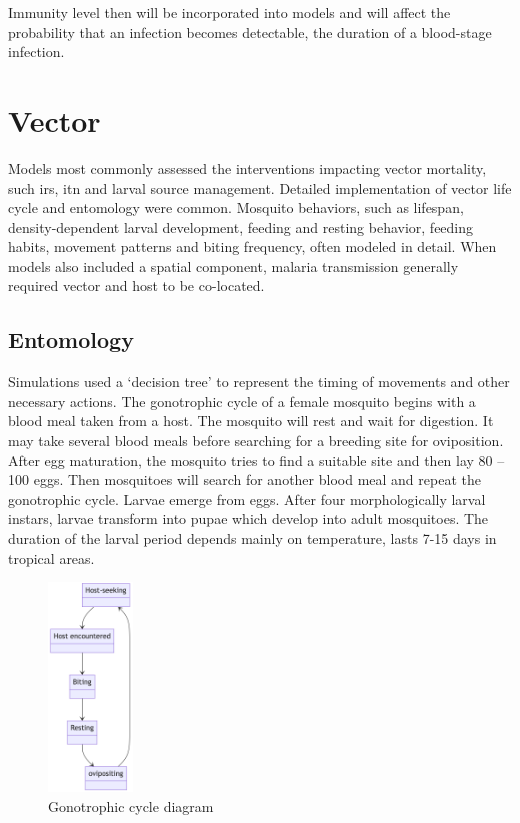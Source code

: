 \documentclass[a4paper, 12pt, twoside]{article}
\begin{document}

Immunity level then will be incorporated into models and will affect the probability that an infection becomes detectable, the duration of a blood-stage infection.

\section{Vector}%
\label{sec:vector}
Models most commonly assessed the interventions impacting vector mortality, such \gls{irs}, \gls{itn} and larval source management.
Detailed implementation of vector life cycle and entomology were common.
Mosquito behaviors, such as lifespan, density-dependent larval development, feeding and resting behavior, feeding habits, movement patterns and biting frequency, often modeled in detail.
When models also included a spatial component, malaria transmission generally required vector and host to be co-located.

\subsection{Entomology}
Simulations used a ‘decision tree’ to represent the timing of movements and other necessary actions.
The gonotrophic cycle of a female mosquito begins with a blood meal taken from a host.
The mosquito will rest and wait for digestion.
It may take several blood meals before searching for a breeding site for oviposition.
After egg maturation, the mosquito tries to find a suitable site and then lay 80 – 100 eggs.
Then mosquitoes will search for another blood meal and repeat the gonotrophic cycle.
Larvae emerge from eggs.
After four morphologically larval instars, larvae transform into pupae which develop into adult mosquitoes.
The duration of the larval period depends mainly on temperature, lasts 7-15 days in tropical areas.

\begin{figure}[htpb]
  \centering
  \includegraphics[width=0.2\textwidth]{gonotrophic-cycle-diagram}
  \caption{Gonotrophic cycle diagram}
  \label{fig:gonotrophic-cycle-diagram}
\end{figure}
\end{document}
